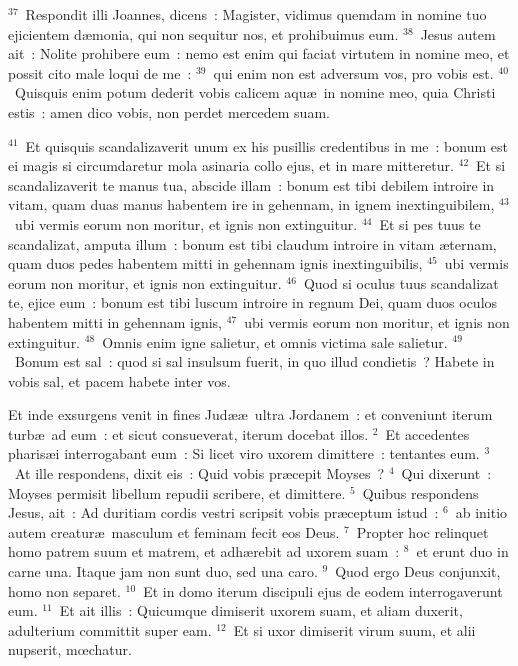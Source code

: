 ${}^{37}$~Respondit illi Joannes, dicens~: Magister, vidimus quemdam in nomine tuo ejicientem d\ae monia, qui non sequitur nos, et prohibuimus eum.
${}^{38}$~Jesus autem ait~: Nolite prohibere eum~: nemo est enim qui faciat virtutem in nomine meo, et possit cito male loqui de me~:
${}^{39}$~qui enim non est adversum vos, pro vobis est.
${}^{40}$~Quisquis enim potum dederit vobis calicem aqu\ae\ in nomine meo, quia Christi estis~: amen dico vobis, non perdet mercedem suam.


${}^{41}$~Et quisquis scandalizaverit unum ex his pusillis credentibus in me~: bonum est ei magis si circumdaretur mola asinaria collo ejus, et in mare mitteretur.
${}^{42}$~Et si scandalizaverit te manus tua, abscide illam~: bonum est tibi debilem introire in vitam, quam duas manus habentem ire in gehennam, in ignem inextinguibilem,
${}^{43}$~ubi vermis eorum non moritur, et ignis non extinguitur.
${}^{44}$~Et si pes tuus te scandalizat, amputa illum~: bonum est tibi claudum introire in vitam \ae ternam, quam duos pedes habentem mitti in gehennam ignis inextinguibilis,
${}^{45}$~ubi vermis eorum non moritur, et ignis non extinguitur.
${}^{46}$~Quod si oculus tuus scandalizat te, ejice eum~: bonum est tibi luscum introire in regnum Dei, quam duos oculos habentem mitti in gehennam ignis,
${}^{47}$~ubi vermis eorum non moritur, et ignis non extinguitur.
${}^{48}$~Omnis enim igne salietur, et omnis victima sale salietur.
${}^{49}$~Bonum est sal~: quod si sal insulsum fuerit, in quo illud condietis~? Habete in vobis sal, et pacem habete inter vos.

\lettrine[lines=3,image=true,loversize=0.05,lraise=-0.03]{E}{}t inde exsurgens venit in fines Jud\ae \ae\ ultra Jordanem~: et conveniunt iterum turb\ae\ ad eum~: et sicut consueverat, iterum docebat illos.
${}^{2}$~Et accedentes pharis\ae i interrogabant eum~: Si licet viro uxorem dimittere~: tentantes eum.
${}^{3}$~At ille respondens, dixit eis~: Quid vobis pr\ae cepit Moyses~?
${}^{4}$~Qui dixerunt~: Moyses permisit libellum repudii scribere, et dimittere.
${}^{5}$~Quibus respondens Jesus, ait~: Ad duritiam cordis vestri scripsit vobis pr\ae ceptum istud~:
${}^{6}$~ab initio autem creatur\ae\ masculum et feminam fecit eos Deus.
${}^{7}$~Propter hoc relinquet homo patrem suum et matrem, et adh\ae rebit ad uxorem suam~:
${}^{8}$~et erunt duo in carne una. Itaque jam non sunt duo, sed una caro.
${}^{9}$~Quod ergo Deus conjunxit, homo non separet.
${}^{10}$~Et in domo iterum discipuli ejus de eodem interrogaverunt eum.
${}^{11}$~Et ait illis~: Quicumque dimiserit uxorem suam, et aliam duxerit, adulterium committit super eam.
${}^{12}$~Et si uxor dimiserit virum suum, et alii nupserit, mœchatur.



